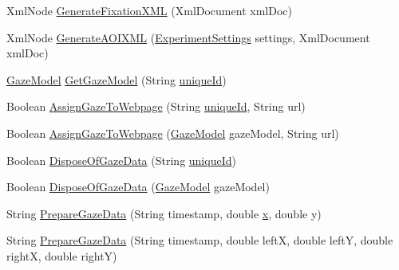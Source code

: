 \begin{DoxyCompactItemize}
\item 
Xml\+Node \hyperlink{class_web_analyzer_1_1_models_1_1_data_model_1_1_test_model_ab0d963dc5a7c320e3133e88585acfadc}{Generate\+Fixation\+X\+M\+L} (Xml\+Document xml\+Doc)
\item 
Xml\+Node \hyperlink{class_web_analyzer_1_1_models_1_1_data_model_1_1_test_model_a1822a101fa0793bd807575d7fcdbd65d}{Generate\+A\+O\+I\+X\+M\+L} (\hyperlink{class_web_analyzer_1_1_models_1_1_settings_model_1_1_experiment_settings}{Experiment\+Settings} settings, Xml\+Document xml\+Doc)
\item 
\hyperlink{class_web_analyzer_1_1_models_1_1_data_model_1_1_gaze_model}{Gaze\+Model} \hyperlink{class_web_analyzer_1_1_models_1_1_data_model_1_1_test_model_a276585c6c2bdca3cf99058e2287636dc}{Get\+Gaze\+Model} (String \hyperlink{_u_i_2_h_t_m_l_resources_2js_2lib_2underscore_8min_8js_af690ff5521d79c7128861033ae80ae17}{unique\+Id})
\item 
Boolean \hyperlink{class_web_analyzer_1_1_models_1_1_data_model_1_1_test_model_a5c8db4f36460523cfefc5726bfd31177}{Assign\+Gaze\+To\+Webpage} (String \hyperlink{_u_i_2_h_t_m_l_resources_2js_2lib_2underscore_8min_8js_af690ff5521d79c7128861033ae80ae17}{unique\+Id}, String url)
\item 
Boolean \hyperlink{class_web_analyzer_1_1_models_1_1_data_model_1_1_test_model_aa2f20e0defbef5daf8b4cbe282fc6a25}{Assign\+Gaze\+To\+Webpage} (\hyperlink{class_web_analyzer_1_1_models_1_1_data_model_1_1_gaze_model}{Gaze\+Model} gaze\+Model, String url)
\item 
Boolean \hyperlink{class_web_analyzer_1_1_models_1_1_data_model_1_1_test_model_a4e84c40eeb26adae1fcacc4ffc291d2f}{Dispose\+Of\+Gaze\+Data} (String \hyperlink{_u_i_2_h_t_m_l_resources_2js_2lib_2underscore_8min_8js_af690ff5521d79c7128861033ae80ae17}{unique\+Id})
\item 
Boolean \hyperlink{class_web_analyzer_1_1_models_1_1_data_model_1_1_test_model_a5f84a8ffb744cbe5dc345e1f34bff9a6}{Dispose\+Of\+Gaze\+Data} (\hyperlink{class_web_analyzer_1_1_models_1_1_data_model_1_1_gaze_model}{Gaze\+Model} gaze\+Model)
\item 
String \hyperlink{class_web_analyzer_1_1_models_1_1_data_model_1_1_test_model_a21b653298654ea728c144a01e1dc79d0}{Prepare\+Gaze\+Data} (String timestamp, double \hyperlink{_u_i_2_h_t_m_l_resources_2js_2lib_2underscore_8min_8js_a81e910173af87b1161e719a504d52407}{x}, double y)
\item 
String \hyperlink{class_web_analyzer_1_1_models_1_1_data_model_1_1_test_model_a9a5e8a32d33cfbd93c7a42260d14e931}{Prepare\+Gaze\+Data} (String timestamp, double left\+X, double left\+Y, double right\+X, double right\+Y)
\end{DoxyCompactItemize}
